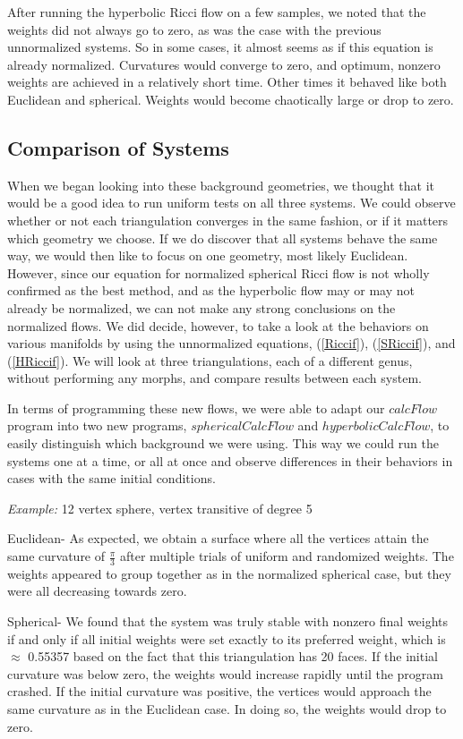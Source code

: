 \documentclass[12pt]{article}
\begin{document}
 After running the hyperbolic Ricci flow on a few samples, we noted that the weights did not always go to zero, as was the case with the previous unnormalized systems. So in some cases, it almost seems as if this equation is already normalized. Curvatures would converge to zero, and optimum, nonzero weights are achieved in a relatively short time. Other times it behaved like both Euclidean and spherical. Weights would become chaotically large or drop to zero.  

\subsection{Comparison of Systems}

When we began looking into these background geometries, we thought that it would be a good idea to run uniform tests on all three systems. We could observe whether or not each triangulation converges in the same fashion, or if it matters which geometry we choose. If we do discover that all systems behave the same way, we would then like to focus on one geometry, most likely Euclidean. However, since our equation for normalized spherical Ricci flow is not wholly confirmed as the best method, and as the hyperbolic flow may or may not already be normalized, we can not make any strong conclusions on the normalized flows. We did decide, however, to take a look at the behaviors on various manifolds by using the unnormalized equations, (\ref{Riccif}), (\ref{SRiccif}), and (\ref{HRiccif}). We will look at three triangulations, each of a different genus, without performing any morphs, and compare results between each system. 

 In terms of programming these new flows, we were able to adapt our $calcFlow$ program into two new programs, $sphericalCalcFlow$ and $hyperbolicCalcFlow$, to easily distinguish which background we were using. This way we could run the systems one at a time, or all at once and observe differences in their behaviors in cases with the same initial conditions. 

 \textit{Example:} 12 vertex sphere, vertex transitive of degree 5

 Euclidean- As expected, we obtain a surface where all the vertices attain the same curvature of $\frac{\pi}{3}$ after multiple trials of uniform and randomized weights. The weights appeared to group together as in the normalized spherical case, but they were all decreasing towards zero.

 Spherical- We found that the system was truly stable with nonzero final weights if and only if all initial weights were set exactly to its preferred weight, which is $\approx$ 0.55357 based on the fact that this triangulation has 20 faces. If the initial curvature was below zero, the weights would increase rapidly until the program crashed. If the initial curvature was positive, the vertices would approach the same curvature as in the Euclidean case. In doing so, the weights would drop to zero.
\end{document}
